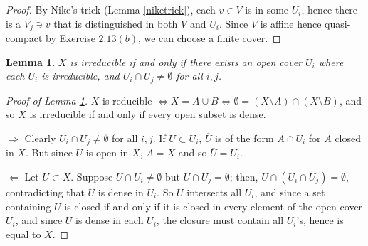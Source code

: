 \documentclass[10pt]{article}
\newtheorem{lemma}[subsubsection]{Lemma}
\theoremstyle{definition}
\theoremstyle{remark}
\numberwithin{equation}{section}
\numberwithin{figure}{subsubsection}
\begin{document}
\begin{proof}
  By Nike's trick (Lemma \ref{niketrick}), each $v \in V$ is in some $U_i$,
  hence there is a $V_j \ni v$ that is distinguished in both $V$ and $U_i$.
  Since $V$ is affine hence quasi-compact by Exercise $2.13(b)$, we can choose a finite cover.
\end{proof}
\begin{lemma}\label{irredlem}
  $X$ is irreducible if and only if there exists an open cover $U_i$ where each $U_i$ is irreducible, and $U_i \cap U_j \ne \emptyset$ for all $i,j$.
\end{lemma}
\begin{proof}[Proof of Lemma \ref{irredlem}]
  $X$ is reducible $\Leftrightarrow X = A \cup B \Leftrightarrow\emptyset = (X\setminus A) \cap (X\setminus B)$, and so $X$ is irreducible if and only if every open subset is dense.
  \par $\Rightarrow$ Clearly $U_i \cap U_j \ne \emptyset$ for all $i,j$. If $U \subset U_i$, $\overline{U}$ is of the form $A \cap U_i$ for $A$ closed in $X$. But since $U$ is open in $X$, $A = X$ and so $\overline{U} = U_i$.
  \par $\Leftarrow$ Let $U \subset X$. Suppose $U \cap U_i \ne \emptyset$ but $U \cap U_j = \emptyset$; then, $U \cap (U_i \cap U_j) = \emptyset$, contradicting that $U$ is dense in $U_i$. So $U$ intersects all $U_i$, and since a set containing $U$ is closed if and only if it is closed in every element of the open cover $U_i$, and since $U$ is dense in each $U_i$, the closure must contain all $U_i$'s, hence is equal to $X$.
\end{proof}

\cleardoublepage
\printbibliography
\cleardoublepage
{}
\renewcommand{\contentsname}{List of Solved Exercises}
{\footnotesize\tableofcontents}
\end{document}
